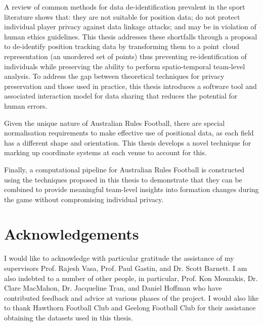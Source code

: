 A review of common methods for data de-identification prevalent in the sport literature shows that: they are not suitable for position data; do not protect individual player privacy against data linkage attacks; and may be in violation of human ethics guidelines. This thesis addresses these shortfalls through a proposal to de-identify position tracking data by transforming them to a point~cloud representation (an unordered set of points) thus preventing re-identification of individuals while preserving the ability to perform spatio-temporal team-level analysis. To address the gap between theoretical techniques for privacy preservation and those used in practice, this thesis introduces a software tool and associated interaction model for data sharing that reduces the potential for human errors.

Given the unique nature of Australian Rules Football, there are special normalisation requirements to make effective use of positional data, as each field has a different shape and orientation. This thesis develops a novel technique for marking up coordinate systems at each venue to account for this.

Finally, a computational pipeline for Australian Rules Football is constructed using the techniques proposed in this thesis to demonstrate that they can be combined to provide meaningful team-level insights into formation changes during the game without compromising individual privacy.



\chapter*{Acknowledgements}
\vspace{-0.5cm}
I would like to acknowledge with particular gratitude the assistance of my supervisors Prof. Rajesh Vasa, Prof. Paul Gastin, and Dr. Scott Barnett. I am also indebted to a number of other people, in particular, Prof. Kon Mouzakis, Dr. Clare MacMahon, Dr. Jacqueline Tran, and Daniel Hoffman who have contributed feedback and advice at various phases of the project.  I would also like to thank Hawthorn Football Club and Geelong Football Club for their assistance obtaining the datasets used in this thesis.

